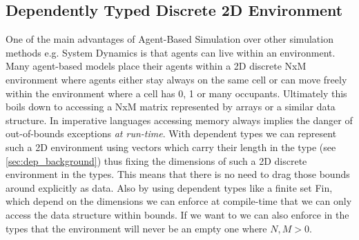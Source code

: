\subsection{Dependently Typed Discrete 2D Environment}
\label{sub:dep_abs_2denv}
One of the main advantages of Agent-Based Simulation over other simulation methods e.g. System Dynamics is that agents can live within an environment. Many agent-based models place their agents within a 2D discrete NxM environment where agents either stay always on the same cell or can move freely within the environment where a cell has 0, 1 or many occupants. Ultimately this boils down to accessing a NxM matrix represented by arrays or a similar data structure. In imperative languages accessing memory always implies the danger of out-of-bounds exceptions \textit{at run-time}. With dependent types we can represent such a 2D environment using vectors which carry their length in the type (see \ref{sec:dep_background}) thus fixing the dimensions of such a 2D discrete environment in the types. This means that there is no need to drag those bounds around explicitly as data. Also by using dependent types like a finite set Fin, which depend on the dimensions we can enforce at compile-time that we can only access the data structure within bounds. If we want to we can also enforce in the types that the environment will never be an empty one where $N, M > 0$.

